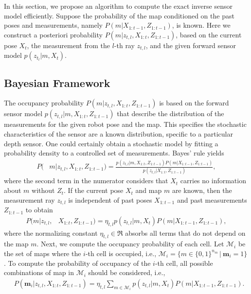 In this section, we propose an algorithm to compute the exact inverse sensor model efficiently. 
Suppose the probability of the map conditioned on the past poses and measurements, namely $P(m|X_{1:t-1},Z_{1:t-1})$, is known. Here we construct a posteriori probability $P(m|z_{t,l},X_{1:t},Z_{1:t-1})$, based on the current pose $X_t$, the measurement from the $l$-th ray $z_{t,l}$, and the given forward sensor model $p(z_{t_l}|m,X_t)$.



\subsection{Bayesian Framework}

The occupancy probability $P(m|z_{t,l},X_{1:t},Z_{1:t-1})$ is based on the forward sensor model $p(z_{t,l}|m,X_{1:t},Z_{1:t-1})$ that describe the distribution of the measurements for the given robot pose and the map. This specifies the stochastic characteristics of the sensor are a known distribution, specific to a particular depth sensor. One could certainly obtain a stochastic model by fitting a probability density to a controlled set of measurements. Bayes' rule yields
\begin{align}
\label{eqn:BayesRuleRayISM}
P(&m|z_{t,l},X_{1:t},Z_{1:t-1})%
=\frac{p(z_{t,l}|m,X_{1:t},Z_{1:t-1})P(m|X_{1:t-1},Z_{1:t-1})}{p(z_{t,l}|X_{1:t},Z_{1:t-1})},
\end{align}
where the second term in the numerator considers that $X_t$ carries no information about $m$ without $Z_t$.
If the current pose $X_t$ and map $m$ are known, then the measurement ray $z_{t,l}$ is independent of past poses $X_{1:t-1}$ and past measurements $Z_{1:t-1}$ to obtain
\begin{align}
P(m|z_{t,l},&X_{1:t},Z_{1:t-1})%
=\eta_{t,l}p(z_{t,l}|m,X_{t})P(m|X_{1:t-1},Z_{1:t-1}),
\end{align}
where the normalizing constant $\eta_{t,l}\in\Re$ absorbs all terms that do not depend on the map $m$.
Next, we compute the occupancy probability of each cell. Let $\mathcal{M}_i$ be the set of maps where the $i$-th cell is occupied, i.e., $\mathcal{M}_i =\{m\in\{0,1\}^{{n_m}}\,|\ \mathbf{m}_i=1\}$. To compute the probability of occupancy of the $i$-th cell, all possible combinations of map in $\mathcal{M}_i$ should be considered, i.e., 
\begin{align}
\label{eqn:InvSenModWithProbDens}
&P(\mathbf{m}_i|z_{t,l},X_{1:t},Z_{1:t-1})%
=\eta_{t,l}\sum_{m\in\mathcal{M}_i}p(z_{t,l}|m,X_{t})P(m|X_{1:t-1},Z_{1:t-1}).
\end{align}
